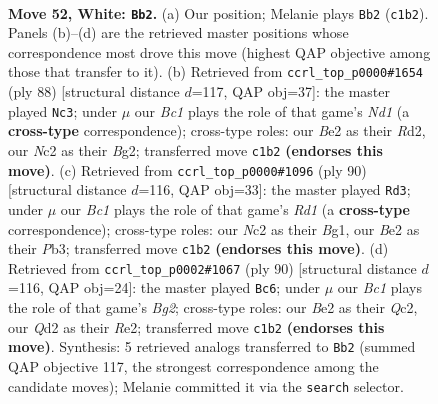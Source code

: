 \documentclass[11pt]{article}
\begin{document}
\clearpage

\begin{figure}[p]\centering
\begin{subfigure}{0.46\textwidth}\centering
\resizebox{\linewidth}{!}{%
\newchessgame
\chessboard[
  setfen={rn1qk1r1/4n1b1/6p1/3p2P1/1p1P1P1p/1R5P/2NQBK2/2B4R w - - 0 52},
  showmover=false,
  pgfstyle=straightmove, color=movearrow, markmove={c1-b2}
]}
\caption{}
\end{subfigure}\hfill
\begin{subfigure}{0.46\textwidth}\centering
\resizebox{\linewidth}{!}{%
\newchessgame
\chessboard[
  setfen={3r1qn1/5r2/R2p2bk/3Pp1p1/6Pp/Q4P1P/3R2B1/3N2K1 w - - 12 45},
  showmover=false,
  pgfstyle=straightmove, color=movearrow, markmove={d1-c3}
]}
\caption{}
\end{subfigure}
\\[4pt]
\begin{subfigure}{0.46\textwidth}\centering
\resizebox{\linewidth}{!}{%
\newchessgame
\chessboard[
  setfen={8/3q1r1k/2n3p1/1N1pbp1p/Pp2n3/1P4PP/2P3Q1/3RR1BK w - - 5 46},
  showmover=false,
  pgfstyle=straightmove, color=movearrow, markmove={d1-d3}
]}
\caption{}
\end{subfigure}\hfill
\begin{subfigure}{0.46\textwidth}\centering
\resizebox{\linewidth}{!}{%
\newchessgame
\chessboard[
  setfen={3qr1k1/3r1pb1/1R3n1p/P1p1pPp1/2P5/2B3PP/2Q1R1B1/6K1 w - - 3 46},
  showmover=false,
  pgfstyle=straightmove, color=movearrow, markmove={g2-c6}
]}
\caption{}
\end{subfigure}
\caption{\textbf{Move 52, White: \texttt{Bb2}.} (a) Our position; Melanie plays \texttt{Bb2} (\texttt{c1b2}). Panels (b)--(d) are the retrieved master positions whose correspondence most drove this move (highest QAP objective among those that transfer to it). (b) Retrieved from \texttt{ccrl\_top\_p0000\#1654} (ply 88) [structural distance $d$=117, QAP obj=37]: the master played \texttt{Nc3}; under $\mu$ our \emph{Bc1} plays the role of that game's \emph{Nd1} (a \textbf{cross-type} correspondence); cross-type roles: our \emph{B}e2 as their \emph{R}d2, our \emph{N}c2 as their \emph{B}g2; transferred move \texttt{c1b2} \textbf{(endorses this move)}. (c) Retrieved from \texttt{ccrl\_top\_p0000\#1096} (ply 90) [structural distance $d$=116, QAP obj=33]: the master played \texttt{Rd3}; under $\mu$ our \emph{Bc1} plays the role of that game's \emph{Rd1} (a \textbf{cross-type} correspondence); cross-type roles: our \emph{N}c2 as their \emph{B}g1, our \emph{B}e2 as their \emph{P}b3; transferred move \texttt{c1b2} \textbf{(endorses this move)}. (d) Retrieved from \texttt{ccrl\_top\_p0002\#1067} (ply 90) [structural distance $d$=116, QAP obj=24]: the master played \texttt{Bc6}; under $\mu$ our \emph{Bc1} plays the role of that game's \emph{Bg2}; cross-type roles: our \emph{B}e2 as their \emph{Q}c2, our \emph{Q}d2 as their \emph{R}e2; transferred move \texttt{c1b2} \textbf{(endorses this move)}. Synthesis: 5 retrieved analogs transferred to \texttt{Bb2} (summed QAP objective 117, the strongest correspondence among the candidate moves); Melanie committed it via the \texttt{search} selector.}
\label{fig:thought-m102}
\end{figure}
\end{document}
